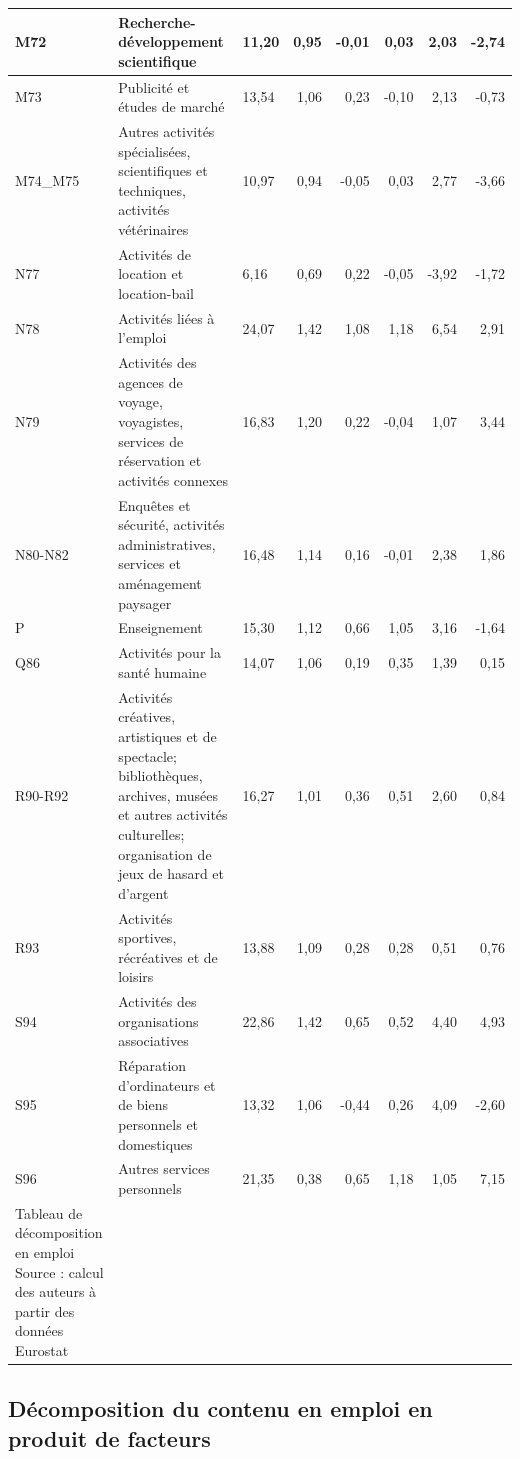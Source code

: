 \begin{small}
\begin{longtable}{m{1.3cm}m{5.7cm}m{1cm}rrrrr}
	\hline
	M72 & Recherche-développement scientifique & 11,20 & 0,95 & -0,01 & 0,03 & 2,03 & -2,74 \\ 
	\hline
	M73 & Publicité et études de marché & 13,54 & 1,06 & 0,23 & -0,10 & 2,13 & -0,73 \\ 
	\hline
	M74\_M75 & Autres activités spécialisées, scientifiques et techniques, activités vétérinaires & 10,97 & 0,94 & -0,05 & 0,03 & 2,77 & -3,66 \\ 
	\hline
	N77 & Activités de location et location-bail & 6,16 & 0,69 & 0,22 & -0,05 & -3,92 & -1,72 \\ 
	\hline
	N78 & Activités liées à l'emploi & 24,07 & 1,42 & 1,08 & 1,18 & 6,54 & 2,91 \\ 
	\hline
	N79 & Activités des agences de voyage, voyagistes, services de réservation et activités connexes & 16,83 & 1,20 & 0,22 & -0,04 & 1,07 & 3,44 \\ 
	\hline
	N80-N82 & Enquêtes et sécurité, activités administratives, services et aménagement paysager & 16,48 & 1,14 & 0,16 & -0,01 & 2,38 & 1,86 \\ 
	\hline
	P & Enseignement & 15,30 & 1,12 & 0,66 & 1,05 & 3,16 & -1,64 \\ 
	\hline
	Q86 & Activités pour la santé humaine & 14,07 & 1,06 & 0,19 & 0,35 & 1,39 & 0,15 \\ 
	\hline
	R90-R92 & Activités créatives, artistiques et de spectacle; bibliothèques, archives, musées et autres activités culturelles; organisation de jeux de hasard et d'argent & 16,27 & 1,01 & 0,36 & 0,51 & 2,60 & 0,84 \\ 
	\hline
	R93 & Activités sportives, récréatives et de loisirs & 13,88 & 1,09 & 0,28 & 0,28 & 0,51 & 0,76 \\ 
	\hline
	S94 & Activités des organisations associatives & 22,86 & 1,42 & 0,65 & 0,52 & 4,40 & 4,93 \\ 
	\hline
	S95 & Réparation d'ordinateurs et de biens personnels et domestiques & 13,32 & 1,06 & -0,44 & 0,26 & 4,09 & -2,60 \\ 
	\hline
	S96 & Autres services personnels & 21,35 & 0,38 & 0,65 & 1,18 & 1,05 & 7,15 \\ 
	\hline
	\hline
	\caption{Tableau de décomposition en emploi \\ Source : calcul des auteurs à partir des données Eurostat} 
	\label{tab:decompo_ce}
\end{longtable}
\end{small}

\clearpage
\subsection{Décomposition du contenu en emploi en produit de facteurs}

